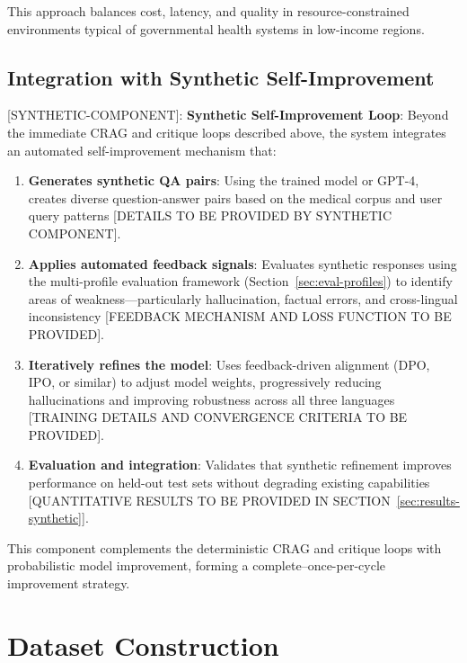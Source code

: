 \documentclass[11pt,a4paper]{article}
\newcommand{\synthetic}[1]{{\colorbox{syntheticcolor}{[SYNTHETIC-COMPONENT]: #1}}}
\begin{document}
This approach balances cost, latency, and quality in resource-constrained environments typical of governmental health systems in low-income regions.

\subsection{Integration with Synthetic Self-Improvement}
\label{sec:methodology-synthetic}

\synthetic{
\textbf{Synthetic Self-Improvement Loop}: Beyond the immediate CRAG and critique loops described above, the system integrates an automated self-improvement mechanism that:

\begin{enumerate}
    \item \textbf{Generates synthetic QA pairs}: Using the trained model or GPT-4, creates diverse question-answer pairs based on the medical corpus and user query patterns [DETAILS TO BE PROVIDED BY SYNTHETIC COMPONENT].
    
    \item \textbf{Applies automated feedback signals}: Evaluates synthetic responses using the multi-profile evaluation framework (Section~\ref{sec:eval-profiles}) to identify areas of weakness---particularly hallucination, factual errors, and cross-lingual inconsistency [FEEDBACK MECHANISM AND LOSS FUNCTION TO BE PROVIDED].
    
    \item \textbf{Iteratively refines the model}: Uses feedback-driven alignment (DPO, IPO, or similar) to adjust model weights, progressively reducing hallucinations and improving robustness across all three languages [TRAINING DETAILS AND CONVERGENCE CRITERIA TO BE PROVIDED].
    
    \item \textbf{Evaluation and integration}: Validates that synthetic refinement improves performance on held-out test sets without degrading existing capabilities [QUANTITATIVE RESULTS TO BE PROVIDED IN SECTION~\ref{sec:results-synthetic}].
\end{enumerate}

This component complements the deterministic CRAG and critique loops with probabilistic model improvement, forming a complete--once-per-cycle improvement strategy.
}

\section{Dataset Construction}
\end{document}
